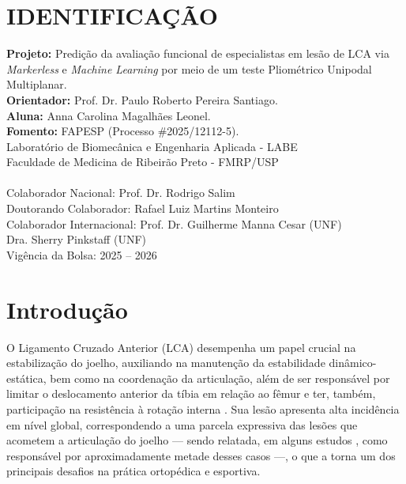 \documentclass{article}
\begin{document}
\newpage

\onehalfspacing
\tableofcontents

\newpage

\section{IDENTIFICAÇÃO}
\noindent\textbf{Projeto:} Predição da avaliação funcional de especialistas em lesão de LCA via \textit{Markerless} e \textit{Machine Learning} por meio de um teste Pliométrico Unipodal Multiplanar.\\
\textbf{Orientador:} Prof. Dr. Paulo Roberto Pereira Santiago.\\
\textbf{Aluna:} Anna Carolina Magalhães Leonel.\\
\textbf{Fomento:} FAPESP (Processo \#2025/12112-5).\\
Laboratório de Biomecânica e Engenharia Aplicada - LABE\\
Faculdade de Medicina de Ribeirão Preto - FMRP/USP\\
\\
Colaborador Nacional: Prof. Dr. Rodrigo Salim\\
Doutorando Colaborador: Rafael Luiz Martins Monteiro\\
Colaborador Internacional: Prof. Dr. Guilherme Manna Cesar (UNF)\\
Dra. Sherry Pinkstaff (UNF)\\
Vigência da Bolsa: 2025 -- 2026

\newpage



\section{Introdução}
\noindent O Ligamento Cruzado Anterior (LCA) desempenha um papel crucial na estabilização do joelho, auxiliando na manutenção da estabilidade dinâmico-estática, bem como na coordenação da articulação, além de ser responsável por limitar o deslocamento anterior da tíbia em relação ao fêmur e ter, também, participação na resistência à rotação interna \cite{Evans2025}. Sua lesão apresenta alta incidência em nível global, correspondendo a uma parcela expressiva das lesões que acometem a articulação do joelho — sendo relatada, em alguns estudos \cite{Evans2025, Petushek2019}, como responsável por aproximadamente metade desses casos —, o que a torna um dos principais desafios na prática ortopédica e esportiva. 
\end{document}
